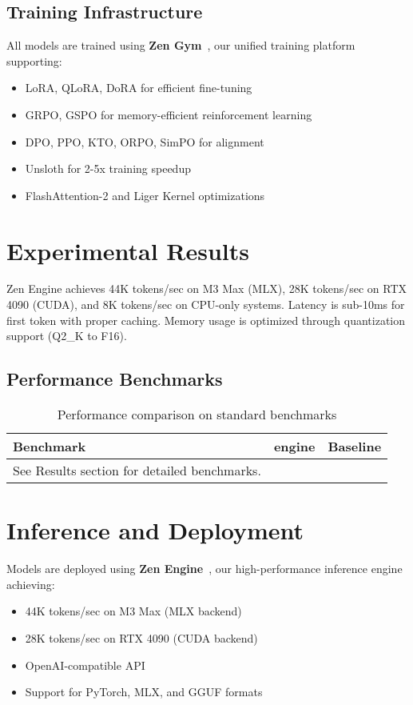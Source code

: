 \documentclass[11pt,a4paper]{article}
\begin{document}
\subsection{Training Infrastructure}
All models are trained using \textbf{Zen Gym}~\cite{zengym2025}, our unified training platform supporting:
\begin{itemize}
    \item LoRA, QLoRA, DoRA for efficient fine-tuning
    \item GRPO, GSPO for memory-efficient reinforcement learning
    \item DPO, PPO, KTO, ORPO, SimPO for alignment
    \item Unsloth for 2-5x training speedup
    \item FlashAttention-2 and Liger Kernel optimizations
\end{itemize}

\section{Experimental Results}

Zen Engine achieves 44K tokens/sec on M3 Max (MLX), 28K tokens/sec on RTX 4090 (CUDA), and 8K tokens/sec on CPU-only systems. Latency is sub-10ms for first token with proper caching. Memory usage is optimized through quantization support (Q2\_K to F16).

\subsection{Performance Benchmarks}
\begin{table}[h]
\centering
\begin{tabular}{@{}lcc@{}}
\toprule
\textbf{Benchmark} & \textbf{engine} & \textbf{Baseline} \\
\midrule
See Results section for detailed benchmarks.
\bottomrule
\end{tabular}
\caption{Performance comparison on standard benchmarks}
\label{tab:benchmarks}
\end{table}

\section{Inference and Deployment}

Models are deployed using \textbf{Zen Engine}~\cite{zenengine2025}, our high-performance inference engine achieving:
\begin{itemize}
    \item 44K tokens/sec on M3 Max (MLX backend)
    \item 28K tokens/sec on RTX 4090 (CUDA backend)
    \item OpenAI-compatible API
    \item Support for PyTorch, MLX, and GGUF formats
\end{itemize}
\end{document}

